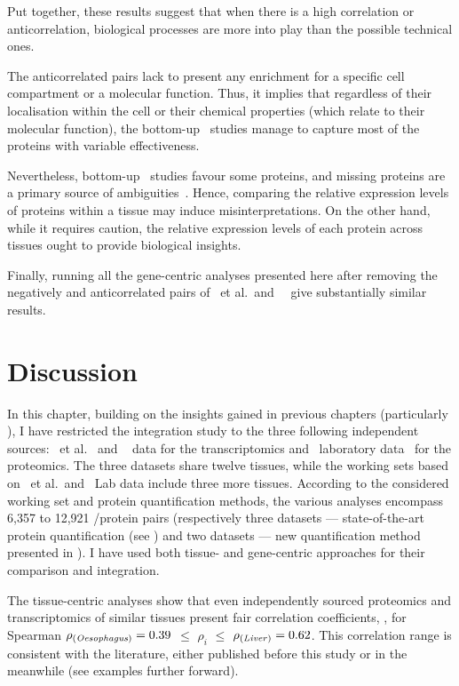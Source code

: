 Put together, these results suggest that
when there is a high correlation or anticorrelation,
biological processes are more into play than the possible technical ones.

The anticorrelated pairs lack to present any enrichment
for a specific cell compartment or a molecular function.
Thus, it implies that
regardless of their localisation within the cell
or their chemical properties (which relate to their molecular function),
the bottom-up \ms\ studies manage to capture most of the proteins
with variable effectiveness.

Nevertheless, bottom-up \ms\ studies favour some proteins,
and missing proteins are a primary source of ambiguities~.
Hence, comparing the relative expression levels of proteins within a tissue
may induce misinterpretations.
On the other hand, while it requires caution,
the relative expression levels of each protein across tissues
ought to provide biological insights.

Finally, running all the gene-centric analyses presented here
after removing the negatively and anticorrelated pairs of \uhlen\ et al.\ and
\gtex\ \mRNAs\ give substantially similar results.

\section{Discussion}

In this chapter,
building on the insights gained in previous chapters
(particularly ),
I have restricted the integration study to
the three following independent sources:
\uhlen\ et al.~
and \gtex~ data for the transcriptomics
and \pandey\ laboratory data~ for the proteomics.
The three datasets share twelve tissues,
while the working sets based on \uhlen\ et al.\ and \pandey\ Lab data
include three more tissues.
According to the considered working set and protein quantification methods,
the various analyses encompass 6,357 to 12,921 \mRNA/protein pairs
(respectively
three datasets --- state-of-the-art protein quantification (see )
and two datasets --- new quantification method presented in ).
I have used both tissue- and gene-centric approaches
for their comparison and integration.\mybr\

The tissue-centric analyses show that
even independently sourced proteomics and transcriptomics of similar tissues
present fair correlation coefficients,
\eg, for Spearman $\rho_{\text{(\emph{Oesophagus})}}=0.39$
$≤$ $\rho_i$ $≤$ $\rho_{\text{(\emph{Liver})}}=0.62$.
This correlation range is consistent with the literature,
either published before this study or in the meanwhile (see examples further forward).

